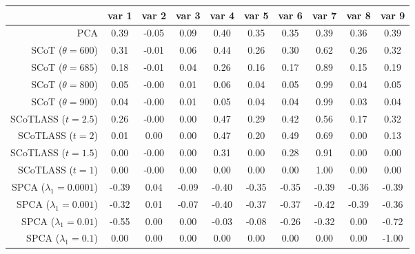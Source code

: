 \begin{tabular}{r|ccccccccc}
\toprule
{} &  var 1 &  var 2 &  var 3 &  var 4 &  var 5 &  var 6 &  var 7 &  var 8 &  var 9 \\
\midrule
PCA                         &   0.39 &  -0.05 &   0.09 &   0.40 &   0.35 &   0.35 &   0.39 &   0.36 &   0.39 \\
SCoT ($\theta = 600$)       &   0.31 &  -0.01 &   0.06 &   0.44 &   0.26 &   0.30 &   0.62 &   0.26 &   0.32 \\
SCoT ($\theta = 685$)       &   0.18 &  -0.01 &   0.04 &   0.26 &   0.16 &   0.17 &   0.89 &   0.15 &   0.19 \\
SCoT ($\theta = 800$)       &   0.05 &  -0.00 &   0.01 &   0.06 &   0.04 &   0.05 &   0.99 &   0.04 &   0.05 \\
SCoT ($\theta = 900$)       &   0.04 &  -0.00 &   0.01 &   0.05 &   0.04 &   0.04 &   0.99 &   0.03 &   0.04 \\
SCoTLASS ($t = 2.5$)        &   0.26 &  -0.00 &   0.00 &   0.47 &   0.29 &   0.42 &   0.56 &   0.17 &   0.32 \\
SCoTLASS ($t = 2$)          &   0.01 &   0.00 &   0.00 &   0.47 &   0.20 &   0.49 &   0.69 &   0.00 &   0.13 \\
SCoTLASS ($t = 1.5$)        &   0.00 &  -0.00 &   0.00 &   0.31 &   0.00 &   0.28 &   0.91 &   0.00 &   0.00 \\
SCoTLASS ($t = 1$)          &   0.00 &  -0.00 &   0.00 &   0.00 &   0.00 &   0.00 &   1.00 &   0.00 &   0.00 \\
SPCA ($\lambda_1 = 0.0001$) &  -0.39 &   0.04 &  -0.09 &  -0.40 &  -0.35 &  -0.35 &  -0.39 &  -0.36 &  -0.39 \\
SPCA ($\lambda_1 = 0.001$)  &  -0.32 &   0.01 &  -0.07 &  -0.40 &  -0.37 &  -0.37 &  -0.42 &  -0.39 &  -0.36 \\
SPCA ($\lambda_1 = 0.01$)   &  -0.55 &   0.00 &   0.00 &  -0.03 &  -0.08 &  -0.26 &  -0.32 &   0.00 &  -0.72 \\
SPCA ($\lambda_1 = 0.1$)    &   0.00 &   0.00 &   0.00 &   0.00 &   0.00 &   0.00 &   0.00 &   0.00 &  -1.00 \\
\bottomrule
\end{tabular}
